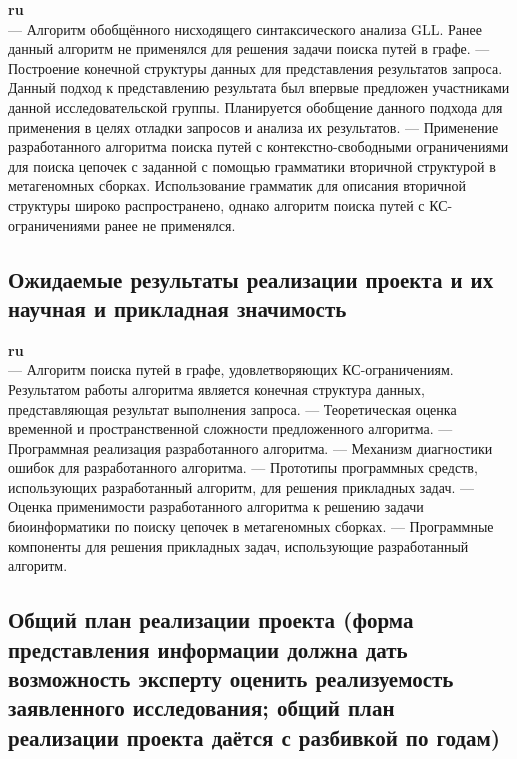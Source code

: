 \documentclass[12pt]{article}  %
\theoremstyle{remark}
\begin{document}
\textbf{ru}\\
— Алгоритм обобщённого нисходящего синтаксического анализа GLL. Ранее данный алгоритм не применялся для решения задачи поиска путей в графе.
— Построение конечной структуры данных для представления результатов запроса. Данный подход к представлению результата был впервые предложен участниками данной исследовательской группы. Планируется обобщение данного подхода для применения в целях отладки запросов и анализа их результатов.
— Применение разработанного алгоритма поиска путей с контекстно-свободными ограничениями для поиска цепочек с заданной с помощью грамматики вторичной структурой в метагеномных сборках. Использование грамматик для описания вторичной структуры широко распространено, однако алгоритм поиска путей с КС-ограничениями ранее не применялся.


\subsection{Ожидаемые результаты реализации проекта и их научная и прикладная значимость}

\textbf{ru}\\
— Алгоритм поиска путей в графе, удовлетворяющих КС-ограничениям. Результатом работы алгоритма является конечная структура данных, представляющая результат выполнения запроса.
— Теоретическая оценка временной и пространственной сложности предложенного алгоритма.
— Программная реализация разработанного алгоритма.
— Механизм диагностики ошибок для разработанного алгоритма.
— Прототипы программных средств, использующих разработанный алгоритм, для решения прикладных задач.
— Оценка применимости разработанного алгоритма к решению задачи биоинформатики по поиску цепочек в метагеномных сборках.
— Программные компоненты для решения прикладных задач, использующие разработанный алгоритм.

\subsection{Общий план реализации проекта (форма представления информации должна дать возможность эксперту оценить реализуемость заявленного исследования; общий план реализации проекта даётся с разбивкой по годам)}
\end{document}
